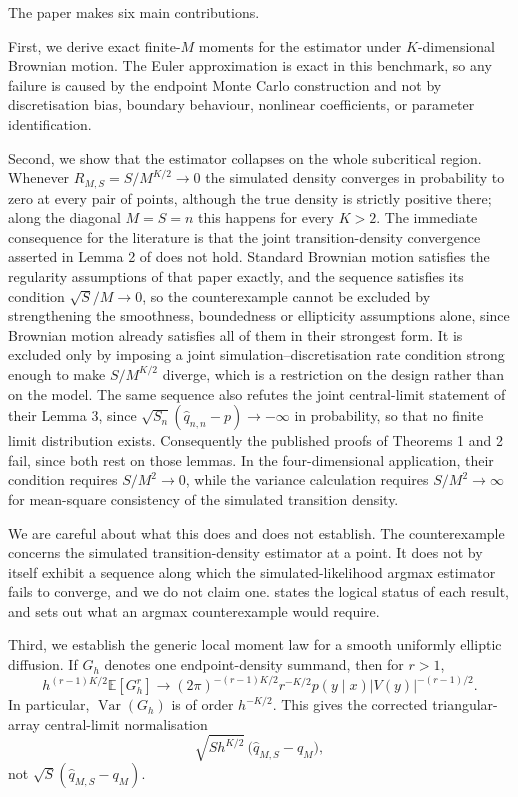 \documentclass[11pt]{article}
\theoremstyle{definition}
\newcommand{\E}{\mathbb{E}}
\newcommand{\Var}{\operatorname{Var}}
\begin{document}
The paper makes six main contributions.

First, we derive exact finite-$M$ moments for the estimator under $K$-dimensional Brownian motion. The Euler approximation is exact in this benchmark, so any failure is caused by the endpoint Monte Carlo construction and not by discretisation bias, boundary behaviour, nonlinear coefficients, or parameter identification.

Second, we show that the estimator collapses on the whole subcritical region. Whenever $R_{M,S}=S/M^{K/2}\to0$ the simulated density converges in probability to zero at every pair of points, although the true density is strictly positive there; along the diagonal $M=S=n$ this happens for every $K>2$. The immediate consequence for the literature is that the joint transition-density convergence asserted in Lemma 2 of \citet{BrandtSantaClara2002} does not hold. Standard Brownian motion satisfies the regularity assumptions of that paper exactly, and the sequence satisfies its condition $\sqrt{S}/M\to0$, so the counterexample cannot be excluded by strengthening the smoothness, boundedness or ellipticity assumptions alone, since Brownian motion already satisfies all of them in their strongest form. It is excluded only by imposing a joint simulation--discretisation rate condition strong enough to make $S/M^{K/2}$ diverge, which is a restriction on the design rather than on the model. The same sequence also refutes the joint central-limit statement of their Lemma 3, since $\sqrt{S_n}(\widehat q_{n,n}-p)\to-\infty$ in probability, so that no finite limit distribution exists. Consequently the published proofs of Theorems 1 and 2 fail, since both rest on those lemmas. In the four-dimensional application, their condition requires $S/M^2\to0$, while the variance calculation requires $S/M^2\to\infty$ for mean-square consistency of the simulated transition density.

We are careful about what this does and does not establish. The counterexample concerns the simulated transition-density estimator at a point. It does not by itself exhibit a sequence along which the simulated-likelihood argmax estimator fails to converge, and we do not claim one.  states the logical status of each result, and  sets out what an argmax counterexample would require.

Third, we establish the generic local moment law for a smooth uniformly elliptic diffusion. If $G_h$ denotes one endpoint-density summand, then for $r>1$,
\[
h^{(r-1)K/2}\E[G_h^r]
\longrightarrow
(2\pi)^{-(r-1)K/2}r^{-K/2}
 p(y\mid x)|V(y)|^{-(r-1)/2}.
\]
In particular, $\Var(G_h)$ is of order $h^{-K/2}$. This gives the corrected triangular-array central-limit normalisation
\[
\sqrt{S h^{K/2}}\,\bigl(\widehat q_{M,S}-q_M\bigr),
\]
not $\sqrt{S}(\widehat q_{M,S}-q_M)$.
\end{document}
